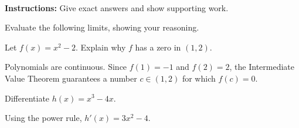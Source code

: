 \documentclass{ximera}
\begin{document}
\begin{examcover}
  \examcoverheading{\examtitletext}
  \noindent\examcoursetext\quad\examversiontext\quad\examdatetext\par
  \noindent\examnameprompt\ \examnamefield\par\bigskip
  \noindent\textbf{Instructions:} Give exact answers and show supporting work.
  \par\bigskip
  \gradetable[h][][4]
\end{examcover}

\begin{questions}

\question Evaluate the following limits, showing your reasoning.

\question[6] Let \(f(x)=x^2-2\). Explain why \(f\) has a zero in \((1,2)\).
\begin{solution}[\stretch{1}]
  Polynomials are continuous. Since \(f(1)=-1\) and \(f(2)=2\),
  the Intermediate Value Theorem guarantees a number \(c\in(1,2)\)
  for which \(f(c)=0\).
\end{solution}

\question[4] Differentiate \(h(x)=x^3-4x\).
\begin{solution}[1in]
  Using the power rule, \(h'(x)=3x^2-4\).
\end{solution}

\end{questions}
\end{document}

